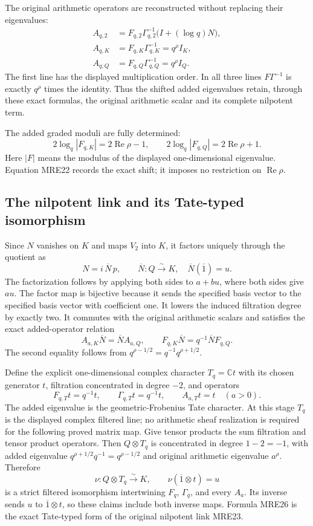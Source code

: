 The original arithmetic operators are reconstructed without replacing
their eigenvalues:
\[
 \begin{aligned}
 A_{q,2}&=F_{q,2}\Gamma_{q,2}^{-1}
                       \bigl(I+(\log q)N\bigr),\\
 A_{q,K}&=F_{q,K}\Gamma_{q,K}^{-1}=q^\rho I_K,\\
 A_{q,Q}&=F_{q,Q}\Gamma_{q,Q}^{-1}=q^\rho I_Q.
 \end{aligned}
 \tag{MRE21}
\]
The first line has the displayed multiplication order. In all three
lines \(F\Gamma^{-1}\) is exactly \(q^\rho\) times the identity.
Thus the shifted added eigenvalues retain, through these exact formulas,
the original arithmetic scalar and its complete nilpotent term.

The added graded moduli are fully determined:
\[
 2\log_q|F_{q,K}|=2\operatorname{Re}\rho-1,\qquad
 2\log_q|F_{q,Q}|=2\operatorname{Re}\rho+1.
 \tag{MRE22}
\]
Here \(|F|\) means the modulus of the displayed one-dimensional
eigenvalue. Equation MRE22 records the exact shift; it imposes no
restriction on \(\operatorname{Re}\rho\).

\subsection{The nilpotent link and its Tate-typed isomorphism}

Since \(N\) vanishes on \(K\) and maps \(V_2\) into \(K\), it factors
uniquely through the quotient as
\[
 N=i\,\overline N\,p,
 \qquad
 \overline N:Q\xrightarrow{\sim}K,
 \quad\overline N(\overline{1})=u.
 \tag{MRE23}
\]
The factorization follows by applying both sides to \(a+bu\), where
both sides give \(au\). The factor map is bijective because it sends
the specified basis vector to the specified basis vector with
coefficient one. It lowers the induced filtration degree by exactly two.
It commutes with the original arithmetic scalars and satisfies the exact
added-operator relation
\[
 A_{a,K}\overline N=\overline N A_{a,Q},\qquad
 F_{q,K}\overline N=q^{-1}\overline N F_{q,Q}.
 \tag{MRE24}
\]
The second equality follows from
\(q^{\rho-1/2}=q^{-1}q^{\rho+1/2}\).

Define the explicit one-dimensional complex character \(T_q=\mathbb C t\)
with its chosen generator \(t\), filtration concentrated in degree
\(-2\), and operators
\[
 F_{q,T}t=q^{-1}t,\qquad
 \Gamma_{q,T}t=q^{-1}t,\qquad
 A_{a,T}t=t\quad(a>0).
 \tag{MRE25}
\]
The added eigenvalue is the geometric-Frobenius Tate character. At this
stage \(T_q\) is the displayed complex filtered line; no arithmetic
sheaf realization is required for the following proved matrix map.
Give tensor products the sum filtration and tensor product operators.
Then \(Q\otimes T_q\) is concentrated in degree \(1-2=-1\), with added
eigenvalue \(q^{\rho+1/2}q^{-1}=q^{\rho-1/2}\) and original arithmetic
eigenvalue \(a^\rho\). Therefore
\[
 \nu:Q\otimes T_q\xrightarrow{\sim}K,
 \qquad \nu(\overline{1}\otimes t)=u
 \tag{MRE26}
\]
is a strict filtered isomorphism intertwining \(F_q\), \(\Gamma_q\), and
every \(A_a\). Its inverse sends \(u\) to \(\overline{1}\otimes t\),
so these claims include both inverse maps. Formula MRE26 is the exact
Tate-typed form of the original nilpotent link MRE23.

